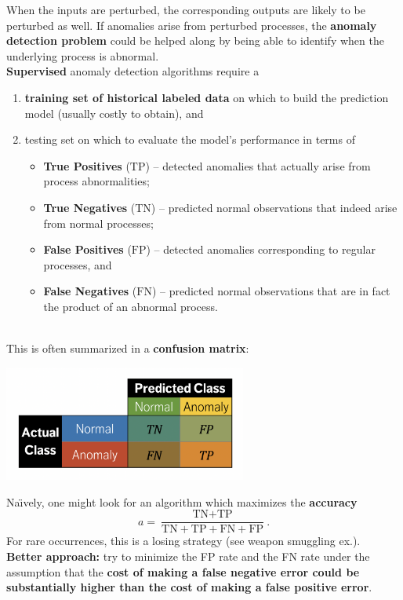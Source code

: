\documentclass[20pt,landscape,footrule,headrule]{foils}
\newcommand{\newl}{\newline\newline}
\begin{document}
\newl When the inputs are perturbed, the corresponding outputs are likely to be perturbed as well. \newl If anomalies arise from perturbed processes, the \textbf{anomaly detection problem} could be helped along by being able to identify when the underlying process is abnormal. 
\newpage\ \\ \noindent  \textbf{Supervised} anomaly detection algorithms require a \begin{enumerate}
\item \textbf{training set of historical labeled data} on which to build the prediction model (usually costly to obtain), and 
\item testing set on which to evaluate the model's performance in terms of 
\begin{itemize}
\item \textbf{True Positives} ($\text{TP}$)  -- detected anomalies that actually arise from process abnormalities; 
\item \textbf{True Negatives} ($\text{TN}$)  -- predicted normal observations that indeed arise from normal processes; 
\item \textbf{False Positives} ($\text{FP}$)  -- detected anomalies corresponding to regular processes, and 
\item \textbf{False Negatives} ($\text{FN}$) -- predicted normal observations that are in fact the product of an abnormal process.
\end{itemize}
\end{enumerate}
\newpage\ \\ \noindent This is often summarized in a \textbf{confusion matrix}:
\begin{center}\includegraphics[width=0.6\textwidth]{Images/Confusion_EN.png}\end{center}
Na\"{\i}vely, one might look for an algorithm which maximizes the \textbf{accuracy} $$a=\frac{\text{TN}+\text{TP}}{\text{TN}+\text{TP}+\text{FN}+\text{FP}}.$$ For rare occurrences, this is a losing strategy (see weapon smuggling ex.). \newpage\ \\ \noindent \textbf{Better approach:} try to minimize the FP rate and the FN rate under the assumption that the \textbf{cost of making a false negative error could be substantially higher than the cost of making a false positive error}. \newl 
\end{document}

